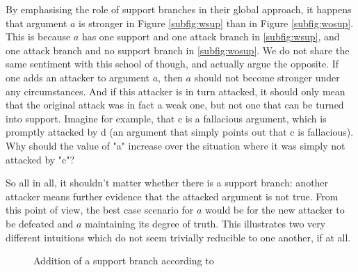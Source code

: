 \documentclass{article}
\begin{document}
By emphasising the role of support branches in their global approach, it happens that argument $a$ is stronger in Figure \ref{subfig:wsup} than in Figure \ref{subfig:wosup}. This is because $a$ has one support and one attack branch in \ref{subfig:wsup}, and one attack branch and no support branch in \ref{subfig:wosup}. We do not share the same sentiment with this school of though, and actually argue the opposite. If one adds an attacker to argument $a$, then $a$ should not become stronger under any circumstances. And if this attacker is in turn attacked, it should only mean that the original attack was in fact a weak one, but not one that can be turned into support. Imagine for example, that c is a fallacious argument, which is promptly attacked by d (an argument that simply points out that c is fallacious). Why should the value of "a" increase over the situation where it was simply not attacked by "c"?

So all in all, it shouldn't matter whether there is a support branch: another attacker means further evidence that the attacked argument is not true. From this point of view, the best case scenario for $a$ would be for the new attacker to be defeated and $a$ maintaining its degree of truth. This illustrates two very different intuitions which do not seem trivially reducible to one another, if at all.

\begin{figure}[h!]
  \centering
   \hspace{1cm}
  
  \caption{Addition of  a support branch according to \cite{gradinarg}}
  \label{fig:oops}
\end{figure}
\end{document}
